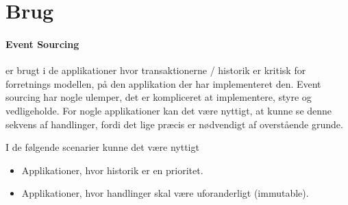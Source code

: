 \section{Brug}

\paragraph{Event Sourcing} er brugt i de applikationer hvor transaktionerne / historik er kritisk for forretnings modellen, på den applikation der har implementeret den. Event sourcing har nogle ulemper, det er kompliceret at implementere, styre og vedligeholde. For nogle applikationer kan det være nyttigt, at kunne se denne sekvens af handlinger, fordi det lige præcis er nødvendigt af overstående grunde. \newline

I de følgende scenarier kunne det være nyttigt

\begin{itemize}  
    \item Applikationer, hvor historik er en prioritet.
    \item Applikationer, hvor handlinger skal være uforanderligt (immutable).
\end{itemize}